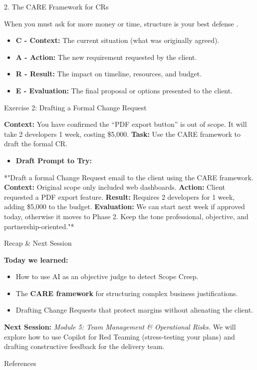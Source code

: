\documentclass[aspectratio=169]{beamer}
\begin{document}
\begin{frame}[fragile]{2. The CARE Framework for CRs}


When you must ask for more money or time, structure is your best defense \cite{prompting2025}.

\begin{itemize}
  \item \textbf{C - Context:} The current situation (what was originally agreed).
  \item \textbf{A - Action:} The new requirement requested by the client.
  \item \textbf{R - Result:} The impact on timeline, resources, and budget.
  \item \textbf{E - Evaluation:} The final proposal or options presented to the client.
\end{itemize}
\end{frame}



\begin{frame}[fragile]{Exercise 2: Drafting a Formal Change Request}


\textbf{Context:} You have confirmed the ``PDF export button'' is out of scope. It will take 2 developers 1 week, costing \$5,000.
\textbf{Task:} Use the CARE framework to draft the formal CR.

\begin{itemize}
  \item \textbf{Draft Prompt to Try:}
\end{itemize}
*"Draft a formal Change Request email to the client using the CARE framework.
\textbf{Context:} Original scope only included web dashboards.
\textbf{Action:} Client requested a PDF export feature.
\textbf{Result:} Requires 2 developers for 1 week, adding \$5,000 to the budget.
\textbf{Evaluation:} We can start next week if approved today, otherwise it moves to Phase 2.
Keep the tone professional, objective, and partnership-oriented."*

\end{frame}



\begin{frame}[fragile]{Recap \& Next Session}


\textbf{Today we learned:}
\begin{itemize}
  \item How to use AI as an objective judge to detect Scope Creep.
  \item The \textbf{CARE framework} for structuring complex business justifications.
  \item Drafting Change Requests that protect margins without alienating the client.
\end{itemize}
\textbf{Next Session:}
\textit{Module 5: Team Management \& Operational Risks.} We will explore how to use Copilot for Red Teaming (stress-testing your plans) and drafting constructive feedback for the delivery team.
\end{frame}




\begin{frame}[allowframebreaks]{References}
  
  
\end{frame}
\end{document}
